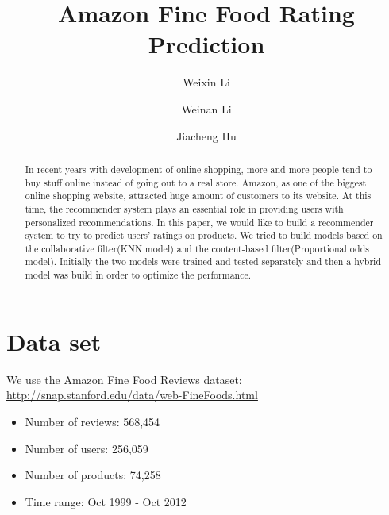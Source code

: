 \documentclass[sigconf]{acmart}
\begin{document}
\title{Amazon Fine Food Rating Prediction}

\author{Weixin Li}

\author{Weinan Li}

\author{Jiacheng Hu}


\begin{abstract}
  In recent years with development of online shopping, more and more people tend to buy stuff online instead of going out to a real store. Amazon, as one of the biggest online shopping website, attracted huge amount of customers to its website. At this time, the recommender system plays an essential role in providing users with personalized recommendations. In this paper, we would like to build a recommender system to try to predict users’ ratings on products. We tried to build models based on the collaborative filter(KNN model) and the content-based filter(Proportional odds model). Initially the two models were trained and tested separately and then a hybrid model was build in order to optimize the performance. 
\end{abstract}


\maketitle

\section{Data set}
We use the Amazon Fine Food Reviews dataset:  \url{http://snap.stanford.edu/data/web-FineFoods.html}
\begin{itemize}
\item Number of reviews: 568,454
\item Number of users: 256,059
\item Number of products: 74,258
\item Time range: Oct 1999 - Oct 2012
\end{itemize}
\end{document}
